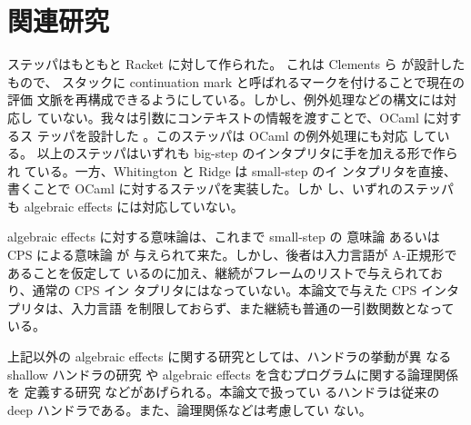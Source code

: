 \section{関連研究}
ステッパはもともと Racket に対して作られた。
これは Clements ら \cite{clements01} が設計したもので、
スタックに continuation mark と呼ばれるマークを付けることで現在の評価
文脈を再構成できるようにしている。しかし、例外処理などの構文には対応し
ていない。我々は引数にコンテキストの情報を渡すことで、OCaml に対するス
テッパを設計した \cite{FCA19}。このステッパは OCaml の例外処理にも対応
している。
以上のステッパはいずれも big-step のインタプリタに手を加える形で作られ
ている。一方、Whitington と Ridge \cite{EPTCS294.3} は small-step のイ
ンタプリタを直接、書くことで OCaml に対するステッパを実装した。しか
し、いずれのステッパも algebraic effects には対応していない。

algebraic effects に対する意味論は、これまで small-step の
意味論 \cite{10.1145/2500365.2500590}
あるいは CPS による意味論 \cite{e6cb0c3222794e48bf38cf44e46fe4aa} が
与えられて来た。しかし、後者は入力言語が A-正規形であることを仮定して
いるのに加え、継続がフレームのリストで与えられており、通常の CPS イン
タプリタにはなっていない。本論文で与えた CPS インタプリタは、入力言語
を制限しておらず、また継続も普通の一引数関数となっている。

上記以外の algebraic effects に関する研究としては、ハンドラの挙動が異
なる shallow ハンドラの研究 \cite{10.1007/978-3-030-02768-1_22} や
algebraic effects を含むプログラムに関する論理関係を
定義する研究 \cite{10.1145/3158096} などがあげられる。本論文で扱ってい
るハンドラは従来の deep ハンドラである。また、論理関係などは考慮してい
ない。

